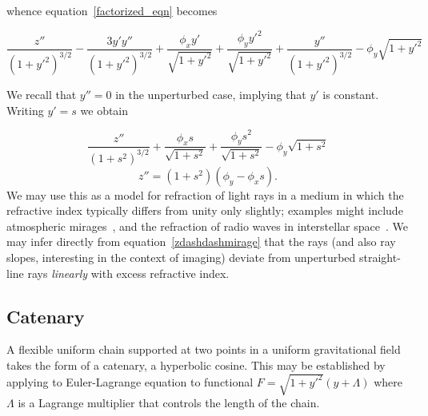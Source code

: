 \documentclass[pdflatex,sn-mathphys-num]{sn-jnl}%
\theoremstyle{thmstyleone}%
\theoremstyle{thmstyletwo}%
\theoremstyle{thmstylethree}%
\begin{document}
whence equation~\ref{factorized_eqn} becomes

\begin{equation}
    \frac{z''}{(1+y'^2)^{3/2}}
  - \frac{3y'y''}{(1+y'^2)^{3/2}}
  + \frac{\phi_xy'}{\sqrt{1+y'^2}}
  + \frac{\phi_yy'^2}{\sqrt{1+y'^2}}
  + \frac{y''}{(1+y'^2)^{3/2}}-\phi_y\sqrt{1+y'^2}
\end{equation}

We recall that $y'' = 0$ in the unperturbed case, implying that $y'$
is constant.  Writing $y'= s$ we obtain

\begin{equation}
  \frac{z''}{(1+s^2)^{3/2}} +
  \frac{\phi_xs}{\sqrt{1+s^2}} + \frac{\phi_ys^2}{\sqrt{1+s^2}} -\phi_y\sqrt{1+s^2}\nonumber
\end{equation}
\begin{equation}
  z'' = (1+s^2)(\phi_y-\phi_xs).\label{zdashdashmirage}
\end{equation}
%
We may use this as a model for refraction of light rays in a medium in
which the refractive index typically differs from unity only slightly;
examples might include atmospheric mirages~\cite{trankle1999}, and the
refraction of radio waves in interstellar space~\cite{romani1986}.  We
may infer directly from equation~\ref{zdashdashmirage} that the rays
(and also ray slopes, interesting in the context of imaging) deviate
from unperturbed straight-line rays {\em linearly} with excess
refractive index.


%


\subsection{Catenary}

A flexible uniform chain supported at two points in a uniform
gravitational field takes the form of a catenary, a hyperbolic cosine.
This may be established by applying to Euler-Lagrange equation to
functional $F=\sqrt{1+y'^2}(y+\Lambda)$ where $\Lambda$ is a Lagrange
multiplier that controls the length of the chain.
\end{document}
